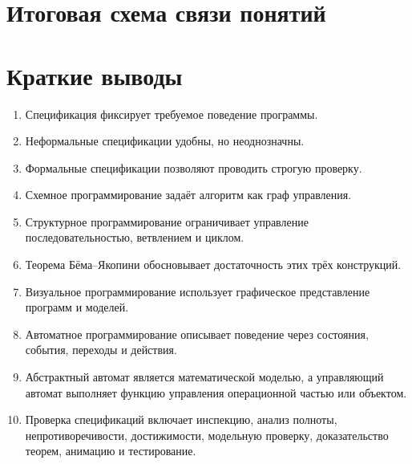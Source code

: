 \documentclass[12pt,a4paper]{article}
\begin{document}
\section{Итоговая схема связи понятий}

\begin{center}
\end{center}

\section{Краткие выводы}

\begin{enumerate}
    \item Спецификация фиксирует требуемое поведение программы.
    \item Неформальные спецификации удобны, но неоднозначны.
    \item Формальные спецификации позволяют проводить строгую проверку.
    \item Схемное программирование задаёт алгоритм как граф управления.
    \item Структурное программирование ограничивает управление последовательностью, ветвлением и циклом.
    \item Теорема Бёма--Якопини обосновывает достаточность этих трёх конструкций.
    \item Визуальное программирование использует графическое представление программ и моделей.
    \item Автоматное программирование описывает поведение через состояния, события, переходы и действия.
    \item Абстрактный автомат является математической моделью, а управляющий автомат выполняет функцию управления операционной частью или объектом.
    \item Проверка спецификаций включает инспекцию, анализ полноты, непротиворечивости, достижимости, модельную проверку, доказательство теорем, анимацию и тестирование.
\end{enumerate}
\end{document}
